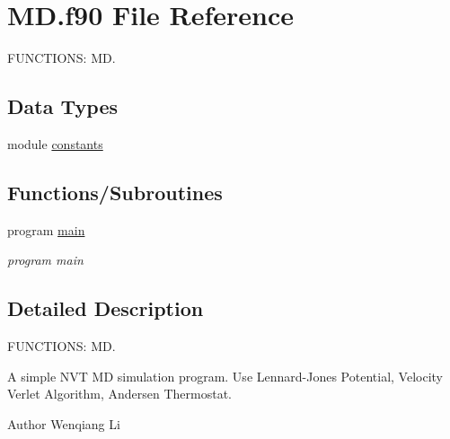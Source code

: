 \hypertarget{MD_8f90}{}\section{M\+D.\+f90 File Reference}
\label{MD_8f90}


F\+U\+N\+C\+T\+I\+O\+N\+S\+: M\+D.  


\subsection*{Data Types}
\begin{DoxyCompactItemize}
\item 
module \hyperlink{classconstants}{constants}
\end{DoxyCompactItemize}
\subsection*{Functions/\+Subroutines}
\begin{DoxyCompactItemize}
\item 
\hypertarget{MD_8f90_a8ec2266d83cd6c0b762cbcbc92c0af3d}{}program \hyperlink{MD_8f90_a8ec2266d83cd6c0b762cbcbc92c0af3d}{main}\label{MD_8f90_a8ec2266d83cd6c0b762cbcbc92c0af3d}

\begin{DoxyCompactList}\small\item\em program main \end{DoxyCompactList}\end{DoxyCompactItemize}


\subsection{Detailed Description}
F\+U\+N\+C\+T\+I\+O\+N\+S\+: M\+D. 

A simple N\+V\+T M\+D simulation program. Use Lennard-\/\+Jones Potential, Velocity Verlet Algorithm, Andersen Thermostat.

\begin{DoxyAuthor}{Author}
Wenqiang Li
\end{DoxyAuthor}

